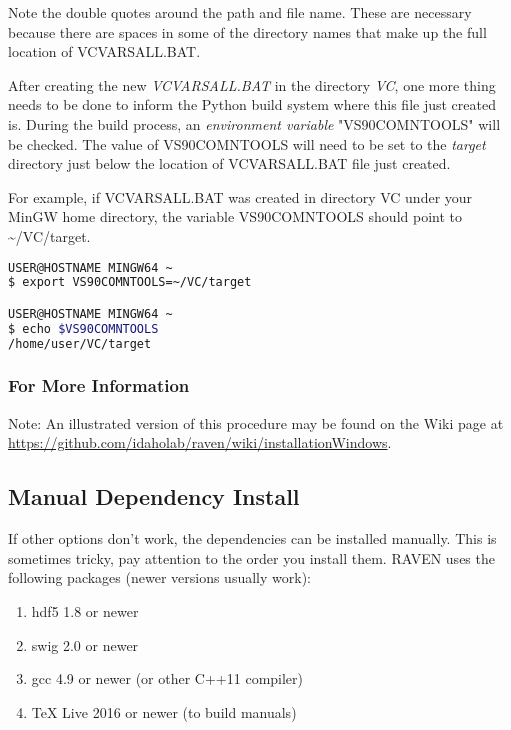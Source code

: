 \begin{enumerate}
		Note the double quotes around the path and file name. These are necessary because
		there are spaces in some of the directory names that make up the full location of
		VCVARSALL.BAT.

		After creating the new {\it VCVARSALL.BAT} in the directory {\it VC}, one more thing
		needs to be done to inform the Python build system where this file just created is.
		During the build process, an {\it environment variable} "VS90COMNTOOLS" will be checked.
		The value of VS90COMNTOOLS will need to be set to the {\it target} directory just below
		the location of VCVARSALL.BAT file just created.

		For example, if VCVARSALL.BAT was created in directory VC under your MinGW home
		directory, the variable VS90COMNTOOLS should point to \textasciitilde /VC/target.

\begin{lstlisting}[language=bash]
USER@HOSTNAME MINGW64 ~
$ export VS90COMNTOOLS=~/VC/target

USER@HOSTNAME MINGW64 ~
$ echo $VS90COMNTOOLS
/home/user/VC/target
\end{lstlisting}

\end{enumerate}

\subsubsection{For More Information}
Note: An illustrated version of this procedure may be found on the Wiki page at
\url{https://github.com/idaholab/raven/wiki/installationWindows}.

\subsection{Manual Dependency Install}
\label{sysprep_manual}

If other options don't work, the dependencies can be installed
manually.  This is sometimes tricky, pay attention to the order you
install them.  RAVEN uses the following packages (newer versions
usually work):

\begin{enumerate}
  
\item hdf5 1.8 or newer
\item swig 2.0 or newer
\item gcc 4.9 or newer (or other C++11 compiler)
\item TeX Live 2016 or newer (to build manuals)
\end{enumerate}

